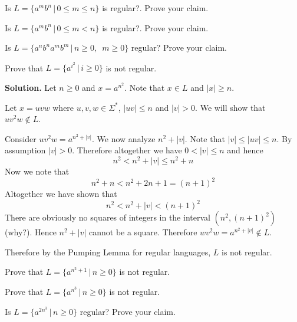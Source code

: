 \newpage
\begin{ex}
Is $L = \{a^m b^n\,|\, 0 \leq m \leq n \}$ is regular?.
Prove your claim.
\end{ex}


\newpage
\begin{ex}
Is $L = \{a^m b^n\,|\, 0 \leq m < n \}$ is regular?.
Prove your claim.
\end{ex}
\vspace{0.1in}

\newpage
\begin{ex}
Is $L = \{a^nb^na^mb^m\,|\, n \geq 0, \,\,\, m \geq 0\}$ regular?
Prove your claim.
\end{ex}


\newpage
\begin{eg}
Prove that $L = \{a^{i^2} \,|\, i \geq 0\}$ is not regular.

\textbf{Solution.} Let $n \geq 0$ and $x = a^{n^2}$. Note that $x \in
L$ and $|x| \geq n$.

Let $x = uvw$ where $u,v,w \in \Sigma^*$, $|uv| \leq n$ and $|v|>0$. We
will show that $uv^2w \notin L$.

Consider $uv^2w = a^{n^2+|v|}$. We now analyze $n^2+|v|$. Note
that $|v| \leq |uv|\leq n$. By assumption $|v|>0$. Therefore
altogether we have $0 < |v| \leq n$ and hence
\[
 n^2 < n^2 + |v| \leq n^2 + n
\]
Now we note that
\[
 n^2 + n < n^2 + 2n + 1 = (n+1)^2
\]
Altogether we have shown that
\[
 n^2 < n^2+|v| < (n+1)^2
\]
There are obviously no squares of integers in the interval
$(n^2,(n+1)^2)$ (why?). Hence $n^2+|v|$ cannot be a square.
Therefore $wv^2w = a^{n^2+|v|} \notin L$.

Therefore by the Pumping Lemma for regular languages, $L$ is not
regular.
\\
\end{eg}


\newpage
\begin{ex}
Prove that $L = \{a^{n^2 + 1} \,|\, n \geq 0\}$ is not regular.
\end{ex}



\newpage
\begin{ex}
Prove that $L = \{a^{n^3} \,|\, n \geq 0\}$ is not regular.
\end{ex}


\newpage
\begin{ex}
Is $L = \{a^{2n^3} \,|\, n \geq 0\}$ regular? 
Prove your claim.
\end{ex}


